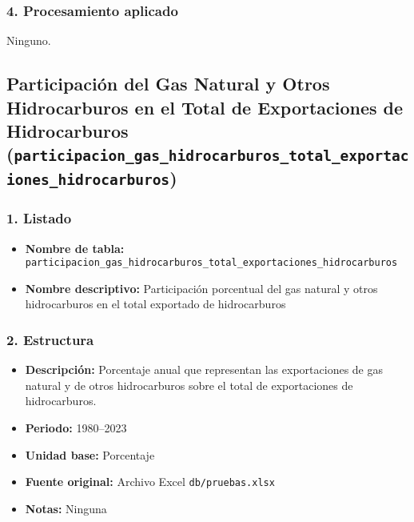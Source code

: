 \documentclass[12pt,a4paper]{article}
\begin{document}
\subsubsection*{4. Procesamiento aplicado}
Ninguno.

\newpage
\subsection{Participación del Gas Natural y Otros Hidrocarburos en el Total de Exportaciones de Hidrocarburos\\
\small(\texttt{participacion\_gas\_hidrocarburos\_total\_exportaciones\_hidrocarburos})}

\subsubsection*{1. Listado}
\begin{itemize}
  \item \textbf{Nombre de tabla:} \texttt{participacion\_gas\_hidrocarburos\_total\_exportaciones\_hidrocarburos}
  \item \textbf{Nombre descriptivo:} Participación porcentual del gas natural y otros hidrocarburos en el total exportado de hidrocarburos
\end{itemize}

\subsubsection*{2. Estructura}
\begin{itemize}
  \item \textbf{Descripción:} Porcentaje anual que representan las exportaciones de gas natural y de otros hidrocarburos sobre el total de exportaciones de hidrocarburos.
  \item \textbf{Periodo:} 1980--2023
  \item \textbf{Unidad base:} Porcentaje
  \item \textbf{Fuente original:} Archivo Excel \texttt{db/pruebas.xlsx}
  \item \textbf{Notas:} Ninguna
\end{itemize}
\end{document}
